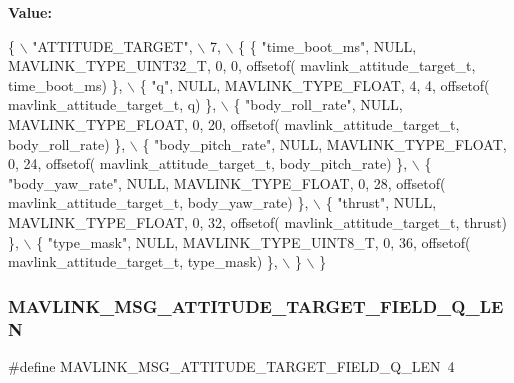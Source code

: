 {\bfseries Value\+:}
\begin{DoxyCode}
\{ \(\backslash\)
    \textcolor{stringliteral}{"ATTITUDE\_TARGET"}, \(\backslash\)
    7, \(\backslash\)
    \{  \{ \textcolor{stringliteral}{"time\_boot\_ms"}, NULL, MAVLINK_TYPE_UINT32_T, 0, 0, offsetof(
      mavlink_attitude_target_t, time\_boot\_ms) \}, \(\backslash\)
         \{ \textcolor{stringliteral}{"q"}, NULL, MAVLINK_TYPE_FLOAT, 4, 4, offsetof(
      mavlink_attitude_target_t, q) \}, \(\backslash\)
         \{ \textcolor{stringliteral}{"body\_roll\_rate"}, NULL, MAVLINK_TYPE_FLOAT, 0, 20, offsetof(
      mavlink_attitude_target_t, body\_roll\_rate) \}, \(\backslash\)
         \{ \textcolor{stringliteral}{"body\_pitch\_rate"}, NULL, MAVLINK_TYPE_FLOAT, 0, 24, offsetof(
      mavlink_attitude_target_t, body\_pitch\_rate) \}, \(\backslash\)
         \{ \textcolor{stringliteral}{"body\_yaw\_rate"}, NULL, MAVLINK_TYPE_FLOAT, 0, 28, offsetof(
      mavlink_attitude_target_t, body\_yaw\_rate) \}, \(\backslash\)
         \{ \textcolor{stringliteral}{"thrust"}, NULL, MAVLINK_TYPE_FLOAT, 0, 32, offsetof(
      mavlink_attitude_target_t, thrust) \}, \(\backslash\)
         \{ \textcolor{stringliteral}{"type\_mask"}, NULL, MAVLINK_TYPE_UINT8_T, 0, 36, offsetof(
      mavlink_attitude_target_t, type\_mask) \}, \(\backslash\)
         \} \(\backslash\)
\}
\end{DoxyCode}
\mbox{\label{mavlink__msg__attitude__target_8h_ab8f8bb4efa37dd24f6b5dde160cf8d75}} 
\subsubsection{M\+A\+V\+L\+I\+N\+K\+\_\+\+M\+S\+G\+\_\+\+A\+T\+T\+I\+T\+U\+D\+E\+\_\+\+T\+A\+R\+G\+E\+T\+\_\+\+F\+I\+E\+L\+D\+\_\+\+Q\+\_\+\+L\+EN}
{\footnotesize\ttfamily \#define M\+A\+V\+L\+I\+N\+K\+\_\+\+M\+S\+G\+\_\+\+A\+T\+T\+I\+T\+U\+D\+E\+\_\+\+T\+A\+R\+G\+E\+T\+\_\+\+F\+I\+E\+L\+D\+\_\+\+Q\+\_\+\+L\+EN~4}

